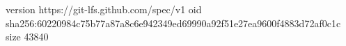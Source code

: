 version https://git-lfs.github.com/spec/v1
oid sha256:60220984c75b77a87a8c6e942349ed69990a92f51e27ea9600f4883d72af0c1c
size 43840
